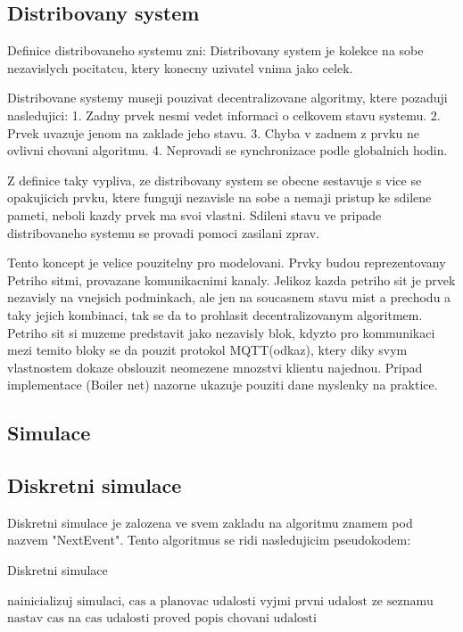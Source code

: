 \subsection*{Distribovany system}
Definice distribovaneho systemu zni:
Distribovany system je kolekce na sobe nezavislych pocitatcu, ktery konecny uzivatel vnima jako celek. 

Distribovane systemy museji pouzivat decentralizovane algoritmy, ktere pozaduji nasledujici: 1. Zadny prvek nesmi vedet informaci o celkovem stavu systemu. 2. Prvek uvazuje jenom na zaklade jeho stavu. 3. Chyba v zadnem z prvku ne ovlivni chovani algoritmu. 4. Neprovadi se synchronizace podle globalnich hodin. 

Z definice taky vypliva, ze distribovany system se obecne sestavuje s vice se opakujicich prvku, ktere funguji nezavisle na sobe a nemaji pristup ke sdilene pameti, neboli kazdy prvek ma svoi vlastni. Sdileni stavu ve pripade distribovaneho systemu se provadi pomoci zasilani zprav.

Tento koncept je velice pouzitelny pro modelovani. Prvky budou reprezentovany Petriho sitmi, provazane komunikacnimi kanaly. Jelikoz kazda petriho sit je prvek nezavisly na vnejsich podminkach, ale jen na soucasnem stavu mist a prechodu a taky jejich kombinaci, tak se da to prohlasit decentralizovanym algoritmem. Petriho sit si muzeme predstavit jako nezavisly blok, kdyzto pro kommunikaci mezi temito bloky se da pouzit protokol MQTT(odkaz), ktery diky svym vlastnostem dokaze obslouzit neomezene mnozstvi klientu najednou. Pripad implementace (Boiler net) nazorne ukazuje pouziti dane myslenky na praktice.
\subsection*{Simulace}
\subsection*{Diskretni simulace}
Diskretni simulace je zalozena ve svem zakladu na algoritmu znamem pod nazvem "NextEvent". Tento algoritmus se ridi nasledujicim pseudokodem:
\begin{algorithm}
  \caption{Diskretni simulace}\label{euclid}
  \begin{algorithmic}[1]
  \State $\text{nainicializuj simulaci, cas a planovac udalosti}$
  \State $\text{vyjmi prvni udalost ze seznamu}$
  \Return
  \EndIf
  \State $\text{nastav cas na cas udalosti}$
  \State $\text{proved popis chovani udalosti}$
  \EndWhile
  \end{algorithmic}
  \end{algorithm}
